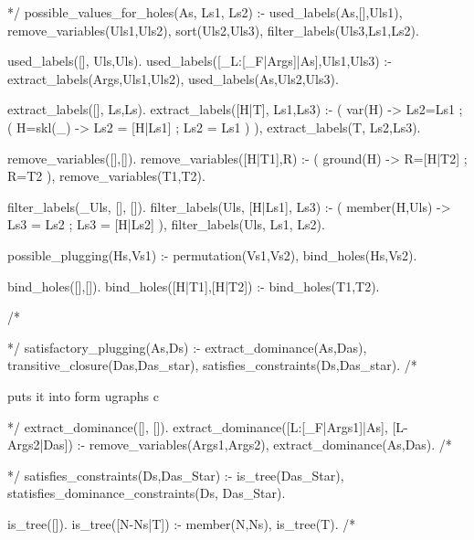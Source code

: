 \documentclass{book}[9pt]
\newenvironment{code}%
{\small \verbatim}%
{\endverbatim \large}
\begin{document}
\begin{code}
*/
possible_values_for_holes(As, Ls1, Ls2) :-
        used_labels(As,[],Uls1),
        remove_variables(Uls1,Uls2),
        sort(Uls2,Uls3),
        filter_labels(Uls3,Ls1,Ls2).

used_labels([], Uls,Uls).
used_labels([_L:[_F|Args]|As],Uls1,Uls3) :-
        extract_labels(Args,Uls1,Uls2),
        used_labels(As,Uls2,Uls3).

extract_labels([], Ls,Ls).
extract_labels([H|T], Ls1,Ls3) :-
        (   var(H) 
        ->  Ls2=Ls1
        ;   ( H=skl(_) 
            -> Ls2 = [H|Ls1]
            ; Ls2 = Ls1
            )
        ),
        extract_labels(T, Ls2,Ls3).
        


remove_variables([],[]).
remove_variables([H|T1],R) :-
        (   ground(H)
        ->  R=[H|T2]
        ;   R=T2
        ),
        remove_variables(T1,T2).

filter_labels(_Uls, [], []).
filter_labels(Uls, [H|Ls1], Ls3) :-
        (   member(H,Uls)
        ->  Ls3 = Ls2
        ;   Ls3 = [H|Ls2]
        ),
        filter_labels(Uls, Ls1, Ls2).


possible_plugging(Hs,Vs1) :-
        permutation(Vs1,Vs2),
        bind_holes(Hs,Vs2).

bind_holes([],[]).
bind_holes([H|T1],[H|T2]) :-
        bind_holes(T1,T2).
        
/*
\end{code}

\begin{code}
*/
satisfactory_plugging(As,Ds) :-
        extract_dominance(As,Das),
        transitive_closure(Das,Das_star),
        satisfies_constraints(Ds,Das_star).
/*
\end{code}

puts it into form ugraphs c

\begin{code}
*/
extract_dominance([], []).
extract_dominance([L:[_F|Args1]|As], [L-Args2|Das]) :-
        remove_variables(Args1,Args2),
        extract_dominance(As,Das).
/*
\end{code}

\begin{code}
*/
satisfies_constraints(Ds,Das_Star) :-
        is_tree(Das_Star),
        statisfies_dominance_constraints(Ds, Das_Star).


is_tree([]).
is_tree([N-Ns|T]) :-
        \+ member(N,Ns),
        is_tree(T).
/*
\end{code}
\end{document}
